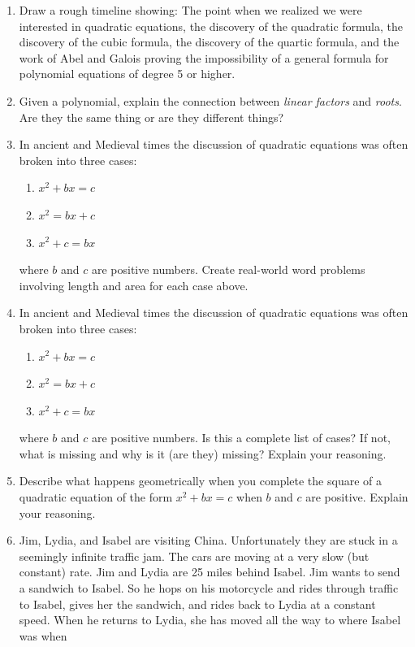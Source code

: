 \begin{problems}
\begin{enumerate}
\item Draw a rough timeline showing: The point when we realized we
  were interested in quadratic equations, the discovery of the
  quadratic formula, the discovery of the cubic formula, the discovery
  of the quartic formula, and the work of Abel and Galois proving the
  impossibility of a general formula for polynomial equations of
  degree 5 or higher.
\item Given a polynomial, explain the connection between
  \textit{linear factors} and \textit{roots}. Are they the same thing
  or are they different things?
\item In ancient and Medieval times the discussion of quadratic
  equations was often broken into three cases:
\begin{enumerate}
\item $x^2 + bx = c$
\item $x^2 = bx + c$
\item $x^2 + c = bx$
\end{enumerate}
where $b$ and $c$ are positive numbers. Create real-world word
problems involving length and area for each case above.
\item In ancient and Medieval times the discussion of quadratic
  equations was often broken into three cases:
\begin{enumerate}
\item $x^2 + bx = c$
\item $x^2 = bx + c$
\item $x^2 + c = bx$
\end{enumerate}
where $b$ and $c$ are positive numbers.  Is this a complete list of
cases? If not, what is missing and why is it (are they)
missing? Explain your reasoning.
\item Describe what happens geometrically when you complete the square
  of a quadratic equation of the form $x^2 + bx = c$ when $b$ and $c$
  are positive. Explain your reasoning.
\item Jim, Lydia, and Isabel are visiting China. Unfortunately they are
  stuck in a seemingly infinite traffic jam. The cars are moving at a
  very slow (but constant) rate. Jim and Lydia are 25 miles behind
  Isabel. Jim wants to send a sandwich to Isabel. So he hops on his
  motorcycle and rides through traffic to Isabel, gives her the
  sandwich, and rides back to Lydia at a constant speed. When he
  returns to Lydia, she has moved all the way to where Isabel was when

\end{enumerate}
\end{problems}
